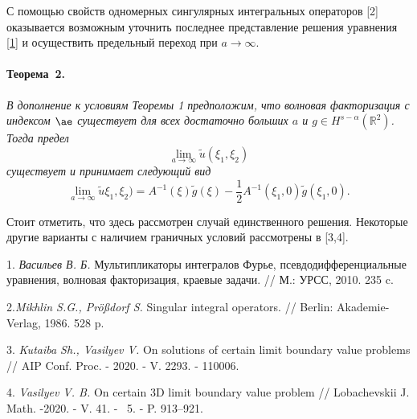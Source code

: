 С помощью свойств одномерных сингулярных интегральных операторов [2] оказывается возможным уточнить последнее представление решения уравнения \eqref{1} и осуществить предельный переход при $a\to\infty$.

\paragraph{Теорема~2.} {\it
В дополнение к условиям Теоремы 1 предположим, что волновая факторизация с индексом $\ae$ существует для всех достаточно больших $a$ и $g\in H^{s-\alpha}(\mathbb R^2)$. Тогда предел
\[
\lim\limits_{a\to\infty}\tilde u(\xi_1,\xi_2)
\]
существует и  принимает следующий вид
\[
\lim\limits_{a\to\infty}\tilde u\xi_1,\xi_2)=A^{-1}(\xi)\tilde g(\xi)-\frac{1}{2}A^{-1}(\xi_1,0)\tilde g(\xi_1,0).
\]
}

Стоит отметить, что здесь рассмотрен случай единственного решения. Некоторые другие варианты
с наличием граничных условий рассмотрены в [3,4].

1. {\it Васильев В. Б.} Мультипликаторы интегралов Фурье, псевдодифференциальные уравнения, волновая факторизация, краевые задачи. // М.: УРСС, 2010. 235  c.

2.{\it Mikhlin S.G., Pr\"o{\ss}dorf S.}
Singular integral operators. // Berlin: Akademie-Verlag, 1986. 528 p.

3. {\it Kutaiba Sh., Vasilyev V.} On solutions of certain limit boundary value
problems // AIP Conf. Proc. - 2020. - V. 2293. - 110006.

4. {\it Vasilyev V. B.} On certain 3D limit boundary value problem // Lobachevskii J. Math. -2020. - V. 41. - \No~5. - P. 913--921.



